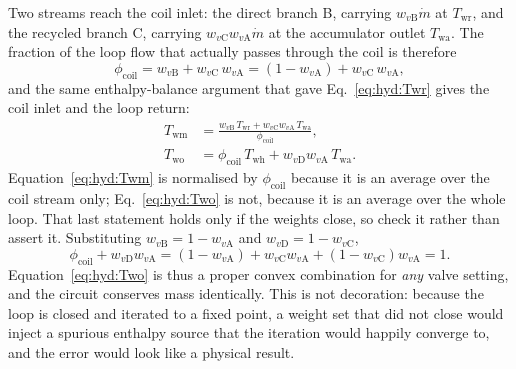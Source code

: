 \documentclass[11pt]{article}
\newcommand{\md}{\ensuremath{\dot m}}
\begin{document}
Two streams reach the coil inlet: the direct branch B, carrying $w_{v\mathrm{B}}\md$ at
$T_{\mathrm{wr}}$, and the recycled branch C, carrying $w_{v\mathrm{C}}w_{v\mathrm{A}}\md$ at
the accumulator outlet $T_{\mathrm{wa}}$. The fraction of the loop flow that actually passes
through the coil is therefore
\begin{equation}
\phi_{\mathrm{coil}}
=w_{v\mathrm{B}}+w_{v\mathrm{C}}\,w_{v\mathrm{A}}
=\left(1-w_{v\mathrm{A}}\right)+w_{v\mathrm{C}}\,w_{v\mathrm{A}} ,
\label{eq:hyd:fraccoil}
\end{equation}
and the same enthalpy-balance argument that gave Eq.~\eqref{eq:hyd:Twr} gives the coil inlet
and the loop return:
\begin{align}
T_{\mathrm{wm}}&=\frac{w_{v\mathrm{B}}\,T_{\mathrm{wr}}
+w_{v\mathrm{C}}w_{v\mathrm{A}}\,T_{\mathrm{wa}}}{\phi_{\mathrm{coil}}},
\label{eq:hyd:Twm}\\[2pt]
T_{\mathrm{wo}}&=\phi_{\mathrm{coil}}\,T_{\mathrm{wh}}
+w_{v\mathrm{D}}w_{v\mathrm{A}}\,T_{\mathrm{wa}} .
\label{eq:hyd:Two}
\end{align}
Equation~\eqref{eq:hyd:Twm} is normalised by $\phi_{\mathrm{coil}}$ because it is an average
over the coil stream only; Eq.~\eqref{eq:hyd:Two} is not, because it is an average over the
whole loop. That last statement holds only if the weights close, so check it rather than assert
it. Substituting $w_{v\mathrm{B}}=1-w_{v\mathrm{A}}$ and $w_{v\mathrm{D}}=1-w_{v\mathrm{C}}$,
\begin{equation}
\phi_{\mathrm{coil}}+w_{v\mathrm{D}}w_{v\mathrm{A}}
=\left(1-w_{v\mathrm{A}}\right)+w_{v\mathrm{C}}w_{v\mathrm{A}}
+\left(1-w_{v\mathrm{C}}\right)w_{v\mathrm{A}}
=1 .
\label{eq:hyd:massclose}
\end{equation}
Equation~\eqref{eq:hyd:Two} is thus a proper convex combination for \emph{any} valve setting,
and the circuit conserves mass identically. This is not decoration: because the loop is closed
and iterated to a fixed point, a weight set that did not close would inject a spurious enthalpy
source that the iteration would happily converge to, and the error would look like a physical
result.
\end{document}
